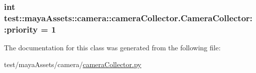 \hypertarget{classtest_1_1mayaAssets_1_1camera_1_1cameraCollector_1_1CameraCollector_abb8a3f44fb1a6978f04dfe35849aba9f}{
\subsubsection[{priority}]{\setlength{\rightskip}{0pt plus 5cm}int {\bf test\-::maya\-Assets\-::camera\-::camera\-Collector.\-Camera\-Collector\-::priority} = 1}}\label{d0/d78/classtest_1_1mayaAssets_1_1camera_1_1cameraCollector_1_1CameraCollector_abb8a3f44fb1a6978f04dfe35849aba9f}


\-The documentation for this class was generated from the following file\-:\begin{DoxyCompactItemize}
\item 
test/maya\-Assets/camera/\hyperlink{mayaAssets_2camera_2cameraCollector_8py}{camera\-Collector.\-py}\end{DoxyCompactItemize}
